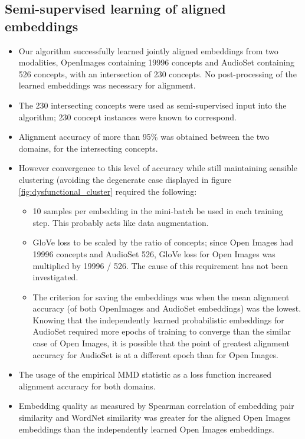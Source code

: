 \subsection{Semi-supervised learning of aligned embeddings}

\begin{itemize}
    \item Our algorithm successfully learned jointly aligned embeddings from two modalities, OpenImages containing 19996 concepts and AudioSet containing 526 concepts, with an intersection of 230 concepts. No post-processing of the learned embeddings was necessary for alignment. 
    \item The 230 intersecting concepts were used as semi-supervised input into the algorithm; 230 concept instances were known to correspond.
    \item Alignment accuracy of more than 95\% was obtained between the two domains, for the intersecting concepts.
    \item However convergence to this level of accuracy while still maintaining sensible clustering (avoiding the degenerate case displayed in figure \ref{fig:dysfunctional_cluster} required the following:
    \begin{itemize}
        \item 10 samples per embedding in the mini-batch be used in each training step. This probably acts like data augmentation. 
        \item GloVe loss to be scaled by the ratio of concepts; since Open Images had 19996 concepts and AudioSet 526, GloVe loss for Open Images was multiplied by 19996 / 526. The cause of this requirement has not been investigated. 
        \item The criterion for saving the embeddings was when the mean alignment accuracy (of both OpenImages and AudioSet embeddings) was the lowest. Knowing that the independently learned probabilistic embeddings for AudioSet required more epochs of training to converge than the similar case of Open Images, it is possible that the point of greatest alignment accuracy for AudioSet is at a different epoch than for Open Images. 
    \end{itemize}
    \item The usage of the empirical MMD statistic as a loss function increased alignment accuracy for both domains.
    \item Embedding quality as measured by Spearman correlation of embedding pair similarity and WordNet similarity was greater for the aligned Open Images embeddings than the independently learned Open Images embeddings.

\end{itemize}
